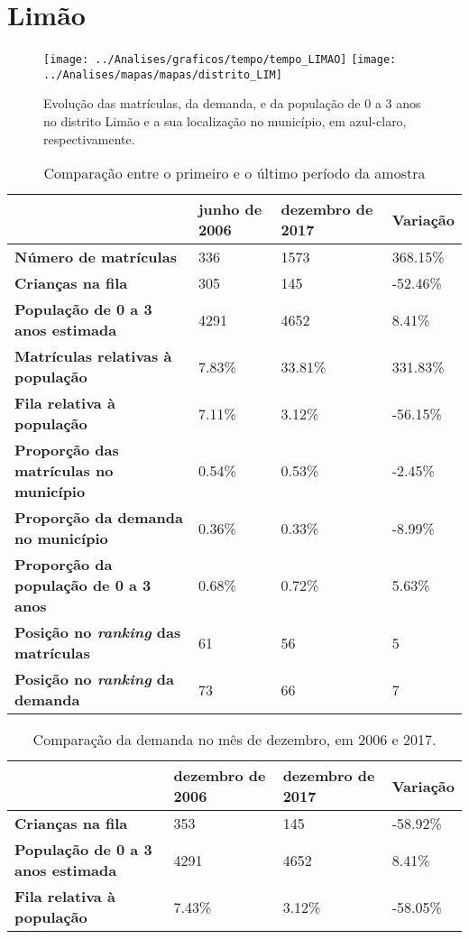 \section{Limão}
\begin{figure}[H]
\centering
\texttt{[image: ../Analises/graficos/tempo/tempo\_LIMAO]}
\texttt{[image: ../Analises/mapas/mapas/distrito\_LIM]}
\caption{Evolução das matrículas, da demanda, e da população de 0 a 3 anos no distrito Limão e a sua localização no município, em azul-claro, respectivamente.}
\end{figure}
\begin{table}[H]
\begin{tabular}{l|l|l|l}
\textbf{}                                      & \textbf{junho de 2006}       & \textbf{dezembro de 2017}    & \textbf{Variação} \\ \hline
\textbf{Número de matrículas}                  & 336 & 1573 & 368.15\% \\ \hline
\textbf{Crianças na fila}                      & 305 & 145 & -52.46\% \\ \hline
\textbf{População de 0 a 3 anos estimada}      & 4291 & 4652 & 8.41\% \\ \hline
\textbf{Matrículas relativas à população}      & 7.83\% & 33.81\% & 331.83\% \\ \hline
\textbf{Fila relativa à população}             & 7.11\% & 3.12\% & -56.15\% \\ \hline
\textbf{Proporção das matrículas no município} & 0.54\% & 0.53\% & -2.45\% \\ \hline
\textbf{Proporção da demanda no município}     & 0.36\% & 0.33\% & -8.99\% \\ \hline
\textbf{Proporção da população de 0 a 3 anos}  & 0.68\% & 0.72\% & 5.63\% \\ \hline
\textbf{Posição no \textit{ranking} das matrículas}     & 61 & 56 & 5 \\ \hline
\textbf{Posição no \textit{ranking} da demanda}         & 73 & 66 & 7 \\ 
\end{tabular}
\caption{Comparação entre o primeiro e o último período da amostra}
\end{table}
\begin{table}[H]
\begin{tabular}{l|l|l|l}
\textbf{}                                 & \textbf{dezembro de 2006} & \textbf{dezembro de 2017} & \textbf{Variação} \\ \hline
\textbf{Crianças na fila}                      & 353 & 145 & -58.92\% \\ \hline
\textbf{População de 0 a 3 anos estimada}      & 4291 & 4652 & 8.41\% \\ \hline
\textbf{Fila relativa à população}             & 7.43\% & 3.12\% & -58.05\% \\
\end{tabular}
\caption{Comparação da demanda no mês de dezembro, em 2006 e 2017.}
\end{table}
